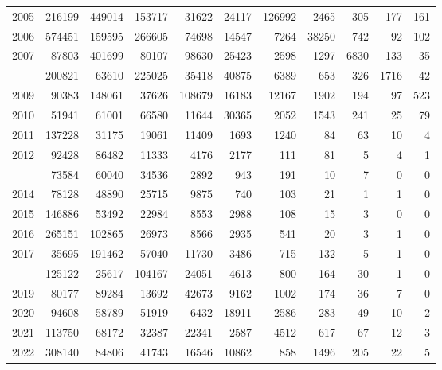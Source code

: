 \documentclass[
]{article}
\begin{document}
\begin{longtable}[t]{lrrrrrrrrrr}
2005 & 216199 & 449014 & 153717 & 31622 & 24117 & 126992 & 2465 & 305 & 177 & 161\\
2006 & 574451 & 159595 & 266605 & 74698 & 14547 & 7264 & 38250 & 742 & 92 & 102\\
2007 & 87803 & 401699 & 80107 & 98630 & 25423 & 2598 & 1297 & 6830 & 133 & 35\\
\addlinespace
2008 & 200821 & 63610 & 225025 & 35418 & 40875 & 6389 & 653 & 326 & 1716 & 42\\
2009 & 90383 & 148061 & 37626 & 108679 & 16183 & 12167 & 1902 & 194 & 97 & 523\\
2010 & 51941 & 61001 & 66580 & 11644 & 30365 & 2052 & 1543 & 241 & 25 & 79\\
2011 & 137228 & 31175 & 19061 & 11409 & 1693 & 1240 & 84 & 63 & 10 & 4\\
2012 & 92428 & 86482 & 11333 & 4176 & 2177 & 111 & 81 & 5 & 4 & 1\\
\addlinespace
2013 & 73584 & 60040 & 34536 & 2892 & 943 & 191 & 10 & 7 & 0 & 0\\
2014 & 78128 & 48890 & 25715 & 9875 & 740 & 103 & 21 & 1 & 1 & 0\\
2015 & 146886 & 53492 & 22984 & 8553 & 2988 & 108 & 15 & 3 & 0 & 0\\
2016 & 265151 & 102865 & 26973 & 8566 & 2935 & 541 & 20 & 3 & 1 & 0\\
2017 & 35695 & 191462 & 57040 & 11730 & 3486 & 715 & 132 & 5 & 1 & 0\\
\addlinespace
2018 & 125122 & 25617 & 104167 & 24051 & 4613 & 800 & 164 & 30 & 1 & 0\\
2019 & 80177 & 89284 & 13692 & 42673 & 9162 & 1002 & 174 & 36 & 7 & 0\\
2020 & 94608 & 58789 & 51919 & 6432 & 18911 & 2586 & 283 & 49 & 10 & 2\\
2021 & 113750 & 68172 & 32387 & 22341 & 2587 & 4512 & 617 & 67 & 12 & 3\\
2022 & 308140 & 84806 & 41743 & 16546 & 10862 & 858 & 1496 & 205 & 22 & 5\\*
\end{longtable}
\end{document}
